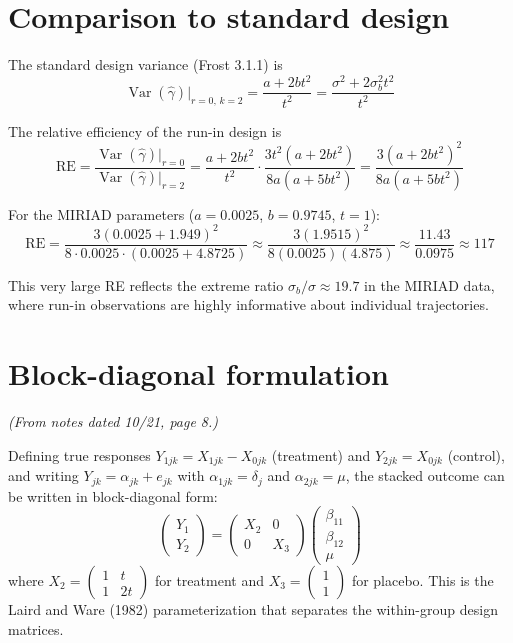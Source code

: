 \documentclass[11pt]{article}
\DeclareMathOperator{\Var}{Var}
\begin{document}
\section{Comparison to standard design}

The standard design variance (Frost 3.1.1) is
\begin{equation}
  \Var(\hat\gamma)\big|_{r=0,\,k=2}
  = \frac{a + 2bt^2}{t^2}
  = \frac{\sigma^2 + 2\sigma_b^2 t^2}{t^2}
\end{equation}

The relative efficiency of the run-in design is
\begin{equation}
  \text{RE}
  = \frac{\Var(\hat\gamma)\big|_{r=0}}
         {\Var(\hat\gamma)\big|_{r=2}}
  = \frac{a + 2bt^2}{t^2}
    \cdot \frac{3t^2(a + 2bt^2)}{8a(a + 5bt^2)}
  = \frac{3(a + 2bt^2)^2}{8a(a + 5bt^2)}
\end{equation}

For the MIRIAD parameters ($a = 0.0025$, $b = 0.9745$,
$t = 1$):
\begin{equation}
  \text{RE} = \frac{3(0.0025 + 1.949)^2}
    {8 \cdot 0.0025 \cdot (0.0025 + 4.8725)}
  \approx \frac{3(1.9515)^2}{8(0.0025)(4.875)}
  \approx \frac{11.43}{0.0975}
  \approx 117
\end{equation}

This very large RE reflects the extreme ratio
$\sigma_b / \sigma \approx 19.7$ in the MIRIAD data, where
run-in observations are highly informative about individual
trajectories.


\section{Block-diagonal formulation}
\label{sec:blockdiag}

\noindent
\textit{(From notes dated 10/21, page 8.)}

\medskip
\noindent
Defining true responses $Y_{1jk} = X_{1jk} - X_{0jk}$
(treatment) and $Y_{2jk} = X_{0jk}$ (control), and
writing $Y_{jk} = \alpha_{jk} + e_{jk}$ with
$\alpha_{1jk} = \delta_j$ and $\alpha_{2jk} = \mu$, the
stacked outcome can be written in block-diagonal form:
\begin{equation}
  \begin{pmatrix} Y_1 \\ Y_2 \end{pmatrix}
  = \begin{pmatrix} X_2 & 0 \\ 0 & X_3 \end{pmatrix}
  \begin{pmatrix} \beta_{11} \\ \beta_{12} \\ \mu \end{pmatrix}
\end{equation}
where $X_2 = \begin{pmatrix} 1 & t \\ 1 & 2t \end{pmatrix}$
for treatment and $X_3 = \begin{pmatrix} 1 \\ 1 \end{pmatrix}$
for placebo. This is the Laird and Ware (1982)
parameterization that separates the within-group design
matrices.
\end{document}
